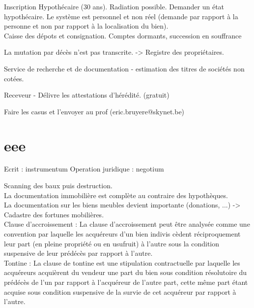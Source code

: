 \documentclass{book}
\begin{document}
Inscription Hypothécaire (30 ans). Radiation possible. Demander un état hypothécaire. Le système est personnel et non réel (demande par rapport à la personne et non par rapport à la localisation du bien).\\

Caisse des dépots et consignation. Comptes dormants, succession en souffrance 

La mutation par décès n'est pas transcrite. -> Registre des propriétaires.

Service de recherche et de documentation - estimation des titres de sociétés non cotées.

Receveur - Délivre les attestations d'hérédité. (gratuit)

Faire les casus et l'envoyer au prof (eric.bruyere@skynet.be)

\chapter{eee}

Ecrit : instrumentum 
Operation juridique : negotium

Scanning des baux puis destruction.\\

La documentation immobilière est complète au contraire des hypothèques.\\

La documentation sur les biens meubles devient importante (donations, ...) -> Cadastre des fortunes mobilières.\\

Clause d'accroissement : La clause d’accroissement peut être analysée comme une convention par laquelle les acquéreurs d’un bien indivis cèdent réciproquement leur part (en pleine propriété ou en usufruit) à l’autre sous la condition suspensive de leur prédécès par rapport à l’autre.\\

Tontine : La clause de tontine est une stipulation contractuelle par laquelle les acquéreurs acquièrent du vendeur une part du bien sous condition résolutoire du prédécès de l’un par rapport à l’acquéreur de l’autre part, cette même part étant acquise sous condition suspensive de la survie de cet acquéreur par rapport à l’autre. \\


\nocite{*}

\end{document}
